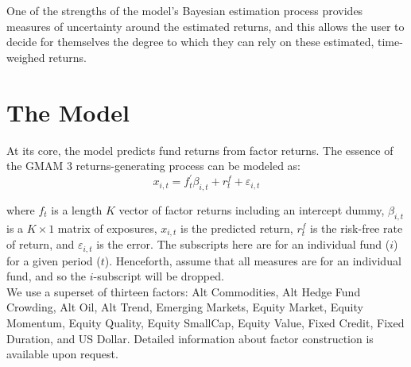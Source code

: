 \documentclass[11pt]{article}
\begin{document}
One of the strengths of the model’s Bayesian estimation process provides measures of uncertainty around the estimated returns, and this allows the user to decide for themselves the degree to which they can rely on these estimated, time-weighed returns.

\section{The Model}
At its core, the model predicts fund returns from factor returns. The essence of the GMAM 3 returns-generating process can be modeled as:
\begin{equation}
	x_{i,t} = f^{\prime}_t \beta_{i,t} + r_t^f + \varepsilon_{i,t}
\end{equation}

where $f_t$ is a length $K$ vector of factor returns including an intercept dummy, $\beta_{i,t}$  is a $K \times 1$ matrix of exposures, $x_{i,t}$ is the predicted return, $r_t^f$ is the risk-free rate of return, and $\varepsilon_{i,t}$ is the error. The subscripts here are for an individual fund ($i$) for a given period ($t$). Henceforth, assume that all measures are for an individual fund, and so the $i$-subscript will be dropped. \\

We use a superset of thirteen factors: Alt Commodities, Alt Hedge Fund Crowding, Alt Oil, Alt Trend, Emerging Markets, Equity Market, Equity Momentum, Equity Quality, Equity SmallCap, Equity Value, Fixed Credit, Fixed Duration, and US Dollar. Detailed information about factor construction is available upon request. \\
\end{document}
